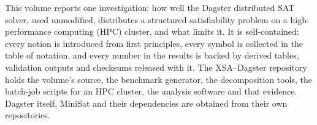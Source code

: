 \documentclass[11pt,a4paper]{article}
\begin{document}
This volume reports one investigation: how well the Dagster distributed SAT solver, used
unmodified, distributes a structured satisfiability problem on a high-performance computing (HPC)
cluster, and what limits it. It is self-contained: every notion is introduced from first principles,
every symbol is collected in the table of notation, and every number in the results is backed by
derived tables, validation outputs and checksums released with it. The XSA--Dagster repository holds
the volume's source, the benchmark generator, the decomposition tools, the batch-job scripts for an
HPC cluster, the analysis software and that evidence. Dagster itself, MiniSat and their dependencies
are obtained from their own repositories.

\newpage

\end{document}
